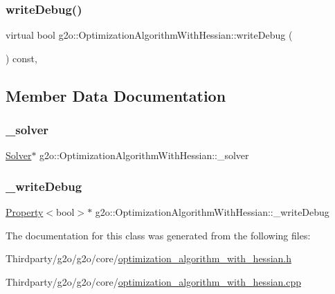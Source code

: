 \subsubsection{\texorpdfstring{write\+Debug()}{writeDebug()}}
{\footnotesize\ttfamily virtual bool g2o\+::\+Optimization\+Algorithm\+With\+Hessian\+::write\+Debug (\begin{DoxyParamCaption}{ }\end{DoxyParamCaption}) const\hspace{0.3cm}{\ttfamily [inline]}, {\ttfamily [virtual]}}



\subsection{Member Data Documentation}
\mbox{\label{classg2o_1_1_optimization_algorithm_with_hessian_a88a2d1dccee8f7481ece407f2681a151}} 
\subsubsection{\texorpdfstring{\+\_\+solver}{\_solver}}
{\footnotesize\ttfamily \mbox{\hyperlink{classg2o_1_1_solver}{Solver}}$\ast$ g2o\+::\+Optimization\+Algorithm\+With\+Hessian\+::\+\_\+solver\hspace{0.3cm}{\ttfamily [protected]}}

\mbox{\label{classg2o_1_1_optimization_algorithm_with_hessian_a6dd1e4e8dc2d09233c40de02b2c9fe8c}} 
\subsubsection{\texorpdfstring{\+\_\+write\+Debug}{\_writeDebug}}
{\footnotesize\ttfamily \mbox{\hyperlink{classg2o_1_1_property}{Property}}$<$bool$>$$\ast$ g2o\+::\+Optimization\+Algorithm\+With\+Hessian\+::\+\_\+write\+Debug\hspace{0.3cm}{\ttfamily [protected]}}



The documentation for this class was generated from the following files\+:\begin{DoxyCompactItemize}
\item 
Thirdparty/g2o/g2o/core/\mbox{\hyperlink{optimization__algorithm__with__hessian_8h}{optimization\+\_\+algorithm\+\_\+with\+\_\+hessian.\+h}}\item 
Thirdparty/g2o/g2o/core/\mbox{\hyperlink{optimization__algorithm__with__hessian_8cpp}{optimization\+\_\+algorithm\+\_\+with\+\_\+hessian.\+cpp}}\end{DoxyCompactItemize}
